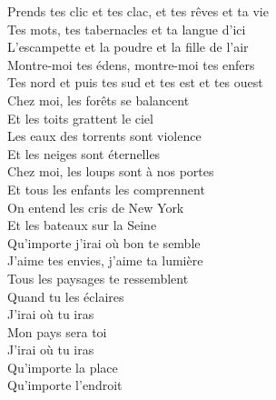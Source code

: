\documentclass{novel}
\begin{document}
\begin{multicols}{2}
Prends tes clic et tes clac, et tes rêves et ta vie \\
Tes mots, tes tabernacles et ta langue d'ici \\
L'escampette et la poudre et la fille de l'air \\
Montre-moi tes édens, montre-moi tes enfers \\
Tes nord et puis tes sud et tes est et tes ouest \\

Chez moi, les forêts se balancent \\
Et les toits grattent le ciel \\
Les eaux des torrents sont violence \\
Et les neiges sont éternelles \\
Chez moi, les loups sont à nos portes \\
Et tous les enfants les comprennent \\
On entend les cris de New York \\
Et les bateaux sur la Seine \\

Qu'importe j'irai où bon te semble \\
J'aime tes envies, j'aime ta lumière \\
Tous les paysages te ressemblent \\
Quand tu les éclaires \\
J'irai où tu iras \\
Mon pays sera toi \\
J'irai où tu iras \\
Qu'importe la place \\
Qu'importe l'endroit \\
\end{multicols}
\end{document}
